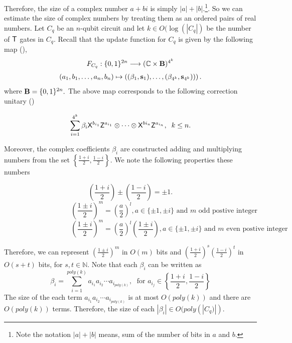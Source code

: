 Therefore, the size of a complex number $a+bi$ is simply $|a|+|b|.$\footnote{Note the notation $|a|+|b|$ means, sum of the number of bits in $a$ and $b.$}. So we can estimate the size of complex numbers by treating them as an ordered pairs of real numbers. Let $C_q$ be an $n$-qubit circuit and let $k\in O(\log(|C_q|)$ be the number of ${\sf T}$ gates in $C_q.$ Recall  that the update function for $C_q$ is given by the following map (),
\begin{equation}
\begin{aligned}
 F_{C_q}: \{0,1\}^{2n}\longrightarrow  (\mathbb{C} \times {\bf B})^{4^k}
 \end{aligned}
\end{equation}
\begin{equation}
\begin{aligned}
 (a_1,b_1,\ldots, a_n,b_n) \mapsto \left((\beta_1, {\bf s}_1),\dots, (\beta_{4^k}, {\bf s}_{4^k}))\right).
\end{aligned}
\end{equation}
where ${\bf B}=\{0,1\}^{2n}.$ The above map corresponds to the following correction unitary ()

 \begin{equation*}
\sum_{i=1}^{4^k} \beta_i {\sf X}^{b_{i_1}} {\sf Z}^{a_{i_1}}\otimes \cdots \otimes {\sf X}^{b{i_n}} {\sf Z}^{a_{i_n}},\;  \; k\leq n.
\end{equation*}

Moreover, the complex coefficients $\beta_i$ are constructed adding and multiplying numbers from the set $\left\{\frac{1+i}{2},\frac{1-i}{2}\right\}.$ We note the following properties these numbers

 $$\left(\frac{1+i}{2}\right)\pm \left(\frac{1-i}{2}\right)=\pm1.$$
$$ \hspace{4cm}\left(\frac{1\pm i}{2}\right)^m=\left(\frac{a}{2}\right)^l, a\in\{\pm 1,\pm i\} \mbox{ and $m$ odd postive integer}$$
 $$\hspace{4cm}\left(\frac{1\pm i}{2}\right)^m=\left(\frac{a}{2}\right)^l \left(\frac{1\pm i}{2}\right), a\in\{\pm 1,\pm i\}\mbox{ and  $m$ even postive integer}$$



 Therefore, we can represent $\left(\frac{1\pm i}{2}\right)^m$ in $O(m)$ bits  and $\left(\frac{1+ i}{2}\right)^{s} \left(\frac{1- i}{2}\right)^{t}$ in $O(s+t)$ bits, for $s,t\in\mathbb{N}.$
 Note that each $\beta_i$ can be written as
 $$\beta_i=\sum_{i=1}^{poly(k)}a_{i_1}a_{i_2}\cdots a_{i_{poly(k)}},\; \mbox{ for } a_{i_j}\in\left\{\frac{1+i}{2},\frac{1-i}{2}\right\}$$
The size of the each term $a_{i_1}a_{i_2}\cdots a_{i_{poly(k)}}$ is at most $O(poly(k))$ and there are $O(poly(k))$ terms. Therefore, the size of each $|\beta_i|\in O(poly(|C_q)|).$


